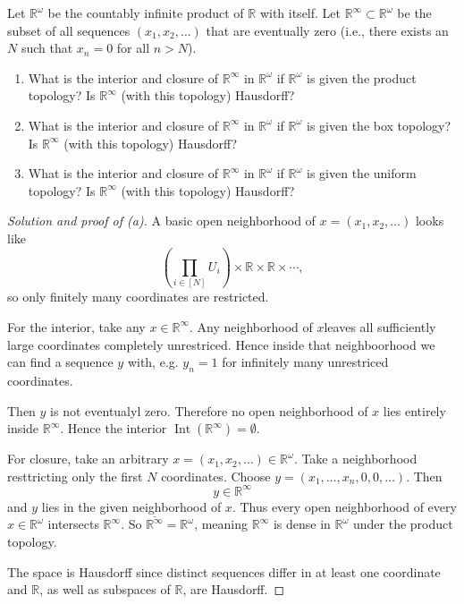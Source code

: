 \begin{prob*}[2]
    Let $\mathbb R^\omega$ be the countably infinite 
    product of $\mathbb R$ with itself. Let 
    $\mathbb R^\infty \subset \mathbb R^\omega$ be the 
    subset of all sequences $(x_1,x_2,\ldots)$ that 
    are eventually zero (i.e., there exists an 
    $N$ such that $x_n = 0$ for all $n > N$). 

    \begin{enumerate}[label=\alph*)]
        \item What is the interior and closure of $\mathbb R^\infty$ 
            in $\mathbb R^\omega$ if $\mathbb R^\omega$ is given the 
            product topology? Is $\mathbb R^\infty$ (with this topology) 
            Hausdorff?
        \item What is the interior and closure of 
            $\mathbb R^\infty$ in $\mathbb R^\omega$ if 
            $\mathbb R^\omega$ is given the box topology? 
            Is $\mathbb R^\infty$ (with this topology)
            Hausdorff? 
        \item What is the interior and closure of 
            $\mathbb R^\infty$ in $\mathbb R^\omega$ if 
            $\mathbb R^\omega$ is given the uniform topology? 
            Is $\mathbb R^\infty$ (with this topology)
            Hausdorff?  
    \end{enumerate}
\end{prob*}

\begin{proof}[Solution and proof of (a)]
    A basic open neighborhood 
    of $x = (x_1,x_2,\ldots)$ looks like 
    \[
        \left(\prod_{i \in [N]} U_i \right)
        \times \mathbb R \times \mathbb R \times \cdots, 
    \]
    so only finitely many coordinates are 
    restricted. 

    For the interior, take any $x \in \mathbb R^\infty$. 
    Any neighborhood of $x$leaves all sufficiently 
    large coordinates completely unrestriced. Hence 
    inside that neighboorhood we can find a sequence 
    $y$ with, e.g. $y_n = 1$ for infinitely many 
    unrestriced coordinates. 

    Then $y$ is not eventualyl zero. Therefore no open neighborhood 
    of $x$ lies entirely inside $\mathbb R^\infty$. 
    Hence the interior $\operatorname{Int}(\mathbb R^\infty) = 
    \emptyset$. 

    For closure, take an arbitrary $x = (x_1,x_2, \ldots) 
    \in \mathbb R^\omega$. 
    Take a neighborhood resttricting only 
    the first $N$ coordinates. 
    Choose $y = (x_1,\ldots,x_n, 0, 0, \ldots).$ 
    Then 
    \[
        y \in \mathbb R^\infty
    \]
    and $y$ lies in the given neighborhood of $x$. 
    Thus every open neighborhood of every 
    $x \in \mathbb R^\omega$ intersects $\mathbb R^\infty$. 
    So $\overline{\mathbb R^\infty} = \mathbb R^\omega$, 
    meaning $\mathbb R^\infty$ is dense in 
    $\mathbb R^\omega$ under the product topology.

    The space is Hausdorff since distinct sequences 
    differ in at least one coordinate and $\mathbb R$, as well 
    as subspaces of $\mathbb R$, are 
    Hausdorff. 
\end{proof}


